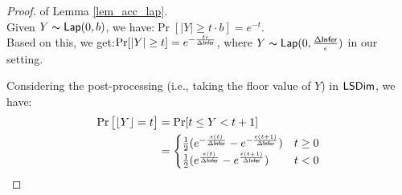 \documentclass{article}
\begin{document}
\begin{proof} of Lemma \ref{lem_acc_lap}.\\
Given $Y \thicksim \mathsf{Lap}(0, b)$, we have\cite{dwork2014algorithmic}:$\Pr[|Y| \geq t \cdot b] = e^{- t}.$\\
Based on this, we get:$\Pr[|Y| \geq t] = e^{- \frac{t \epsilon}{\Delta \mathsf{Infer}}}$, where $Y \thicksim \mathsf{Lap}(0, \frac{\Delta \mathsf{Infer}}{\epsilon})$ in our setting.

Considering the post-processing (i.e., taking the floor value of $Y$) in $\mathsf{LSDim}$, we have:
\begin{align*}
\Pr\big[\lfloor Y \rfloor = t\big]&= \Pr[ t \leq Y < t + 1]\\
&= 
\begin{cases}
\frac{1}{2} (e^{- \frac{\epsilon (t)}{\Delta \mathsf{Infer}}} - e^{- \frac{\epsilon (t + 1)}{\Delta \mathsf{Infer}}}) &  t \geq 0\\
\frac{1}{2} (e^{\frac{\epsilon (t)}{\Delta \mathsf{Infer}}} - e^{\frac{\epsilon (t + 1)}{\Delta \mathsf{Infer}}}) & t < 0
\end{cases}
\end{align*}


\end{proof}
\end{document}
